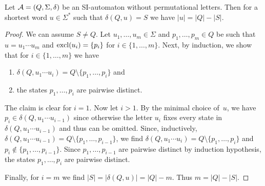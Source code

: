 \begin{proposition} \label{prelim:prop:SI-without-perm:reach-bound}
	Let $\mathcal A = (Q, \Sigma, \delta)$ be an SI-automaton without permutational letters.
	Then for a shortest word $u \in \Sigma^*$ such that $\delta(Q, u) = S$
	we have $|u| = |Q| - |S|$.
\end{proposition}
\begin{proof}	
	We can assume $S \ne Q$.
	Let $u_1, \ldots, u_m \in \Sigma$ and $p_1, \ldots, p_m \in Q$
	be such that $u = u_1 \cdots u_m$ and $\operatorname{excl}(u_i) = \{p_i\}$
	for $i \in \{1,\ldots,m\}$.
	Next, by induction, we show that for $i \in \{1,\ldots,m\}$ we have
	\begin{enumerate}	
		\item $\delta(Q, u_1 \cdots u_i) = Q \setminus \{ p_1, \ldots, p_i \}$ and
		
		\item the states $p_1, \ldots, p_i$ are pairwise distinct.
	\end{enumerate}	
	The claim is clear for $i = 1$. Now let $i > 1$.
	By the minimal choice of~$u$,
	we have $p_i \in \delta(Q, u_1 \cdots u_{i-1})$
	since otherwise the letter $u_i$ fixes every state in $\delta(Q, u_1 \cdots u_{i-1})$
	and thus can be omitted.
	Since, inductively, $\delta(Q, u_1 \cdots u_{i-1}) = Q \setminus \{p_1, \ldots, p_{i-1}\}$,
	we find $\delta(Q, u_1 \cdots u_i) = Q \setminus \{ p_1, \ldots, p_i \}$
	and $p_i \notin \{p_1, \ldots, p_{i-1}\}$.
	Since $p_1, \ldots, p_{i-1}$ are pairwise distinct by induction hypothesis,
	the states $p_1, \ldots, p_i$ are pairwise distinct.
	
	Finally, for $i = m$ we find $|S| = |\delta(Q, u)| = |Q| - m$.
	Thus $m = |Q| - |S|$.	
\end{proof}